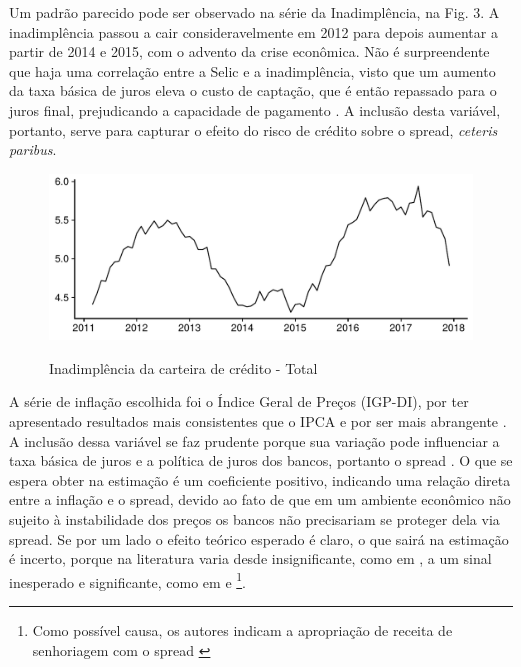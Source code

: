 \documentclass[a4paper,
               article,
               12pt,
               openany,
               oneside,
               english,
               brazil]{abntex2}
\numberwithin{equation}{section}
\begin{document}
    Um padrão parecido pode ser observado na série da Inadimplência, na Fig. 3. A inadimplência passou a cair consideravelmente em 2012 para depois aumentar a partir de 2014 e 2015, com o advento da crise econômica. Não é surpreendente que haja uma correlação entre a Selic e a inadimplência, visto que um aumento da taxa básica de juros eleva o custo de captação, que é então repassado para o juros final, prejudicando a capacidade de pagamento \cite[p.~390]{oliveira2007}. A inclusão desta variável, portanto, serve para capturar o efeito do risco de crédito sobre o spread, \textit{ceteris paribus}.

    \begin{figure}[t]
        \centering
        \caption{Inadimplência da carteira de crédito - Total}
        \includegraphics[width = \textwidth, scale=0.75]{Inadimplencia.pdf}
        \label{inad}
    \end{figure}

    A série de inflação escolhida foi o Índice Geral de Preços (IGP-DI), por ter apresentado resultados mais consistentes que o IPCA \cite[p.~66]{rocha09} e por ser mais abrangente \cite[p.~21]{afanasieff02}. A inclusão dessa variável se faz prudente porque sua variação pode influenciar a taxa básica de juros e a política de juros dos bancos, portanto o spread \cite[p.~14]{bignotto06}. O que se espera obter na estimação é um coeficiente positivo, indicando uma relação direta entre a inflação e o spread, devido ao fato de que em um ambiente econômico não sujeito à instabilidade dos preços os bancos não precisariam se proteger dela via spread. Se por um lado o efeito teórico esperado é claro, o que sairá na estimação é incerto, porque na literatura varia desde insignificante, como em , a um sinal inesperado e significante, como em  e \footnote{Como possível causa, os autores indicam a apropriação de receita de senhoriagem com o spread \cite[p.~25]{afanasieff02}}.
    
\end{document}
